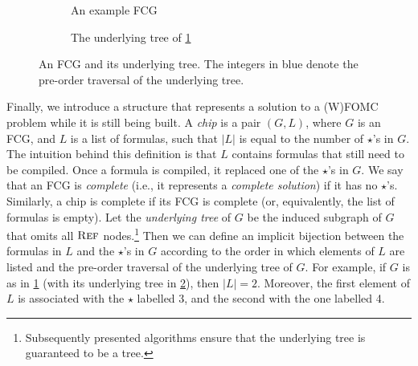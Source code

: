 \documentclass[letterpaper]{article} %
\DeclareMathOperator{\Reff}{\textsc{Ref}}
\theoremstyle{definition}
\theoremstyle{remark}
\begin{document}
\begin{figure}[t]
  \centering
  \begin{subfigure}{0.49\linewidth}
    \centering
    \caption{An example FCG}\label{fig:smallexample1}
  \end{subfigure}
  \begin{subfigure}{0.49\linewidth}
    \centering
    \caption{The underlying tree of
      \cref{fig:smallexample1}}\label{fig:smallexample2}
  \end{subfigure}
  \caption{An FCG and its underlying tree. The integers in blue denote the
    pre-order traversal of the underlying tree.}\label{fig:ordering}
\end{figure}

Finally, we introduce a structure that represents a solution to a (W)FOMC
problem while it is still being built. A \emph{chip} is a pair $(G, L)$, where
$G$ is an FCG, and $L$ is a list of formulas, such that $|L|$ is equal to the
number of $\star$'s in $G$. The intuition behind this definition is that $L$
contains formulas that still need to be compiled. Once a formula is compiled, it
replaced one of the $\star$'s in $G$. We say that an FCG is \emph{complete}
(i.e., it represents a \emph{complete solution}) if it has no $\star$'s.
Similarly, a chip is complete if its FCG is complete (or, equivalently, the list
of formulas is empty). Let the \emph{underlying tree} of $G$ be the induced
subgraph of $G$ that omits all $\Reff$ nodes.\footnote{Subsequently presented
  algorithms ensure that the underlying tree is guaranteed to be a tree.} Then
we can define an implicit bijection between the formulas in $L$ and the
$\star$'s in $G$ according to the order in which elements of $L$ are listed and
the pre-order traversal of the underlying tree of $G$. For example, if $G$ is as
in \cref{fig:smallexample1} (with its underlying tree in
\cref{fig:smallexample2}), then $|L| = 2$. Moreover, the first element of $L$ is
associated with the $\star$ labelled 3, and the second with the one labelled 4.
\end{document}

